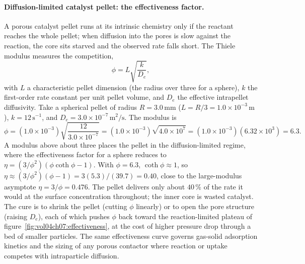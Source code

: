 \paragraph{Diffusion-limited catalyst pellet: the effectiveness factor.}
A porous catalyst pellet runs at its intrinsic chemistry only if the
reactant reaches the whole pellet; when diffusion into the pores is slow
against the reaction, the core sits starved and the observed rate falls
short. The Thiele modulus measures the competition,
\[
\phi = L\sqrt{\frac{k}{D_e}},
\]
with $L$ a characteristic pellet dimension (the radius over three for a
sphere), $k$ the first-order rate constant per unit pellet volume, and
$D_e$ the effective intrapellet diffusivity. Take a spherical pellet of
radius $R = 3.0\,\si{\milli\meter}$ ($L = R/3 = 1.0\times 10^{-3}\,\si{
\meter}$), $k = 12\,\text{s}^{-1}$, and $D_e = 3.0\times 10^{-7}\,\si{
\meter\squared\per\second}$. The modulus is
\[
\phi = (1.0\times 10^{-3})\sqrt{\frac{12}{3.0\times 10^{-7}}} =
(1.0\times 10^{-3})\sqrt{4.0\times 10^{7}} = (1.0\times 10^{-3})(6.32
\times 10^{3}) = 6.3.
\]
A modulus above about three places the pellet in the diffusion-limited
regime, where the effectiveness factor for a sphere reduces to
$\eta = (3/\phi^2)(\phi\coth\phi - 1)$. With $\phi = 6.3$, $\coth\phi
\approx 1$, so $\eta \approx (3/\phi^2)(\phi - 1) = 3(5.3)/(39.7) =
0.40$, close to the large-modulus asymptote $\eta = 3/\phi = 0.476$. The
pellet delivers only about $40\,\%$ of the rate it would at the surface
concentration throughout; the inner core is wasted catalyst. The cure is
to shrink the pellet (cutting $\phi$ linearly) or to open the pore
structure (raising $D_e$), each of which pushes $\phi$ back toward the
reaction-limited plateau of figure~\ref{fig:vol04ch07:effectiveness}, at
the cost of higher pressure drop through a bed of smaller particles. The
same effectiveness curve governs gas-solid adsorption kinetics and the
sizing of any porous contactor where reaction or uptake competes with
intraparticle diffusion.



